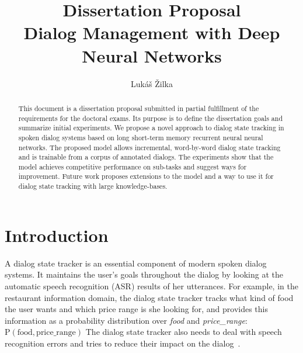\documentclass[runningheads,a4paper]{llncs}
\title{
{\large \textnormal{Dissertation Proposal}} \\
Dialog Management with Deep Neural Networks
}
\author{Lukáš Žilka}
\institute{
Institute of Formal and Applied Linguistics \\
Faculty of Matematics and Physics \\
Charles University in Prague \\
}
\date{}
\begin{document}



\mainmatter

\maketitle



\begin{abstract}
This document is a dissertation proposal submitted in partial fulfillment of the requirements for the doctoral exams. Its purpose is to define the dissertation goals and summarize initial experiments. We propose a novel approach to dialog state tracking in spoken dialog systems based on long short-term memory recurrent neural neural networks. The proposed model allows incremental, word-by-word dialog state tracking and is trainable from a corpus of annotated dialogs. The experiments show that the model achieves competitive performance on sub-tasks and suggest ways for improvement. Future work proposes extensions to the model and a way to use it for dialog state tracking with large knowledge-bases.
\end{abstract}

\section{Introduction}


A dialog state tracker is an essential component of modern spoken dialog systems. It maintains the user's goals throughout the dialog by looking at the automatic speech recognition (ASR) results of her utterances. For example, in the restaurant information domain, the dialog state tracker tracks what kind of food the user wants and which price range is she looking for, and provides this information as a probability distribution over \emph{food} and \emph{price\_range}: $\operatorname{P(\mbox{food}, \mbox{price\_range})}$ The dialog state tracker also needs to deal with speech recognition errors and tries to reduce their impact on the dialog~\cite{williams2013dialog}.
\end{document}
